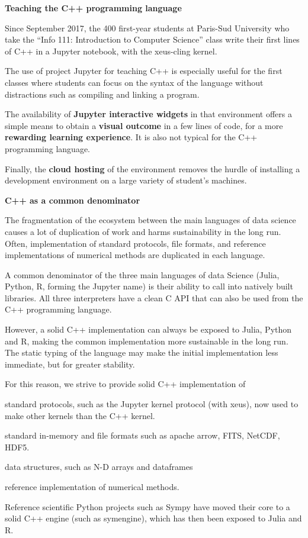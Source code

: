 \begin{task}[title=Interactive C++ in Jupyter with XEUS,
  id=xeus-cpp,
  lead=QS,
  PM=12,
  wphases={0-48},
  partners={QS,UPSUD}
]
\textbf{Teaching the C++ programming language}

Since September 2017, the 400 first-year students at Paris-Sud
University who take the ``Info 111: Introduction to Computer Science''
class write their first lines of C++ in a Jupyter notebook, with the
xeus-cling kernel.

The use of project Jupyter for teaching C++ is especially useful for the
first classes where students can focus on the syntax of the language
without distractions such as compiling and linking a program.

The availability of \textbf{Jupyter interactive widgets} in that
environment offers a simple means to obtain a \textbf{visual outcome} in
a few lines of code, for a more \textbf{rewarding learning experience}.
It is also not typical for the C++ programming language.

Finally, the \textbf{cloud hosting} of the environment removes the
hurdle of installing a development environment on a large variety of
student's machines.

\textbf{C++ as a common denominator}

The fragmentation of the ecosystem between the main languages of data
science causes a lot of duplication of work and harms sustainability in
the long run. Often, implementation of standard protocols, file formats,
and reference implementations of numerical methods are duplicated in
each language.

A common denominator of the three main languages of data Science (Julia,
Python, R, forming the Jupyter name) is their ability to call into
natively built libraries. All three interpreters have a clean C API that
can also be used from the C++ programming language.

However, a solid C++ implementation can always be exposed to Julia,
Python and R, making the common implementation more sustainable in the
long run. The static typing of the language may make the initial
implementation less immediate, but for greater stability.

For this reason, we strive to provide solid C++ implementation of

\begin{compactenum}
\item
  standard protocols, such as the Jupyter kernel protocol (with xeus),
  now used to make other kernels than the C++ kernel.
\item
  standard in-memory and file formats such as apache arrow, FITS,
  NetCDF, HDF5.
\item
  data structures, such as N-D arrays and dataframes
\item
  reference implementation of numerical methods.
\end{compactenum}

Reference scientific Python projects such as Sympy have moved their core
to a solid C++ engine (such as symengine), which has then been exposed
to Julia and R.

\end{task}
